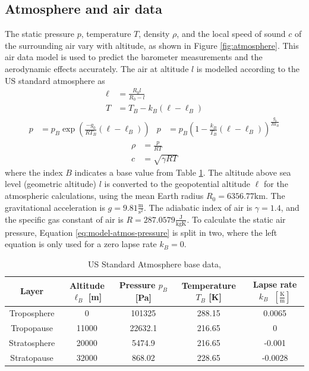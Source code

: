 \subsection{Atmosphere and air data}
\label{sec:model-atmosphere}
The static pressure $p$, temperature $T$, density $\rho$, and the local speed of sound $c$ of the surrounding air vary with altitude, as shown in Figure \ref{fig:atmosphere}.
This air data model is used to predict the barometer measurements and the aerodynamic effects accurately.
The air at altitude $l$ is modelled according to the US standard atmosphere \cite{usstandardatmosphere1976, stengel2004} as
\begin{align}
    \ell &= \frac{ R_0 l }{ R_0 - l } \label{eq:model-atmos-geopot} \\
    T &= T_B - k_B (\ell-\ell_B) \label{eq:model-atmos-temperature}
\end{align}
\begin{align}
    p &= p_B \exp \left( \frac{-g_0}{R T_B} (\ell-\ell_B) \right) &
    p &= p_B \left( 1 - \frac{k_B}{T_B} (\ell-\ell_B) \right) ^\frac{g_0}{R k_B} \label{eq:model-atmos-pressure}
\end{align}
\begin{align}
    \rho &= \frac{p}{R T} \label{eq:model-atmos-density} \\
    c &= \sqrt{\gamma R T} \label{eq:model-atmos-mach}
\end{align}
where the index $B$ indicates a base value from Table \ref{tab:atmosphere}. 
The altitude above sea level (geometric altitude) $l$ is converted to the geopotential altitude $\ell$ for the atmospheric calculations, using the mean Earth radius $R_0 = 6356.77 \mathrm{km}$. The gravitational acceleration is $g = 9.81 \frac{\mathrm{m}}{\mathrm{s}^2}$.
The adiabatic index of air is $\gamma = 1.4$, and the specific gas constant of air is $R = 287.0579 \frac{\mathrm{J}}{\mathrm{kg K}}$.
To calculate the static air pressure, Equation \ref{eq:model-atmos-pressure} is split in two, where the left equation is only used for a zero lapse rate $k_B = 0$.
\begin{table}[ht]
\begin{center}
\begin{tabular}{c c c c c}
Layer & Altitude $\ell_B$ [m] & Pressure $p_B$ [Pa] & Temperature $T_B$ [K] & Lapse rate $k_B \text{ } [\frac{\mathrm{K}}{\mathrm{m}}]$  \\
\hline %
Troposphere & 0 & 101325 & 288.15 & 0.0065 \\
Tropopause & 11000 & 22632.1 & 216.65 & 0 \\
Stratosphere & 20000 & 5474.9 & 216.65 & -0.001 \\ 
Stratopause & 32000 & 868.02 & 228.65 & -0.0028 \\
\end{tabular}
\end{center}
\caption[Atmosphere base data]{US Standard Atmosphere base data, \cite{usstandardatmosphere1976}} \label{tab:atmosphere}
\end{table}

